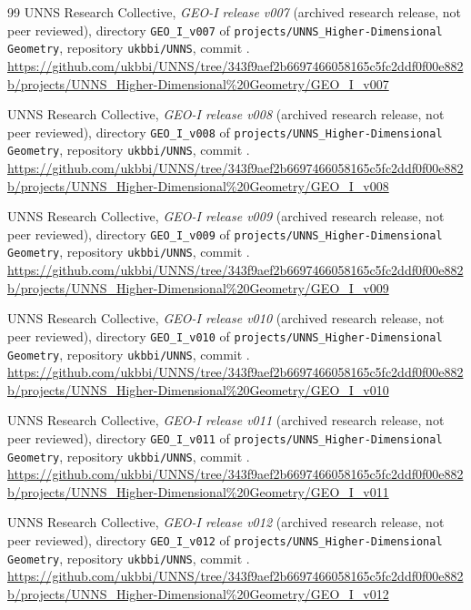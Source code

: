 \begin{thebibliography}{99}
UNNS Research Collective, \emph{GEO-I release v007} (archived research release, not peer reviewed), directory \texttt{GEO\_I\_v007} of \texttt{projects/UNNS\_Higher-Dimensional Geometry}, repository \texttt{ukbbi/UNNS}, commit \geoicommit. \url{https://github.com/ukbbi/UNNS/tree/343f9aef2b6697466058165c5fc2ddf0f00e882b/projects/UNNS_Higher-Dimensional%20Geometry/GEO_I_v007}

UNNS Research Collective, \emph{GEO-I release v008} (archived research release, not peer reviewed), directory \texttt{GEO\_I\_v008} of \texttt{projects/UNNS\_Higher-Dimensional Geometry}, repository \texttt{ukbbi/UNNS}, commit \geoicommit. \url{https://github.com/ukbbi/UNNS/tree/343f9aef2b6697466058165c5fc2ddf0f00e882b/projects/UNNS_Higher-Dimensional%20Geometry/GEO_I_v008}

UNNS Research Collective, \emph{GEO-I release v009} (archived research release, not peer reviewed), directory \texttt{GEO\_I\_v009} of \texttt{projects/UNNS\_Higher-Dimensional Geometry}, repository \texttt{ukbbi/UNNS}, commit \geoicommit. \url{https://github.com/ukbbi/UNNS/tree/343f9aef2b6697466058165c5fc2ddf0f00e882b/projects/UNNS_Higher-Dimensional%20Geometry/GEO_I_v009}

UNNS Research Collective, \emph{GEO-I release v010} (archived research release, not peer reviewed), directory \texttt{GEO\_I\_v010} of \texttt{projects/UNNS\_Higher-Dimensional Geometry}, repository \texttt{ukbbi/UNNS}, commit \geoicommit. \url{https://github.com/ukbbi/UNNS/tree/343f9aef2b6697466058165c5fc2ddf0f00e882b/projects/UNNS_Higher-Dimensional%20Geometry/GEO_I_v010}

UNNS Research Collective, \emph{GEO-I release v011} (archived research release, not peer reviewed), directory \texttt{GEO\_I\_v011} of \texttt{projects/UNNS\_Higher-Dimensional Geometry}, repository \texttt{ukbbi/UNNS}, commit \geoicommit. \url{https://github.com/ukbbi/UNNS/tree/343f9aef2b6697466058165c5fc2ddf0f00e882b/projects/UNNS_Higher-Dimensional%20Geometry/GEO_I_v011}

UNNS Research Collective, \emph{GEO-I release v012} (archived research release, not peer reviewed), directory \texttt{GEO\_I\_v012} of \texttt{projects/UNNS\_Higher-Dimensional Geometry}, repository \texttt{ukbbi/UNNS}, commit \geoicommit. \url{https://github.com/ukbbi/UNNS/tree/343f9aef2b6697466058165c5fc2ddf0f00e882b/projects/UNNS_Higher-Dimensional%20Geometry/GEO_I_v012}

\end{thebibliography}
